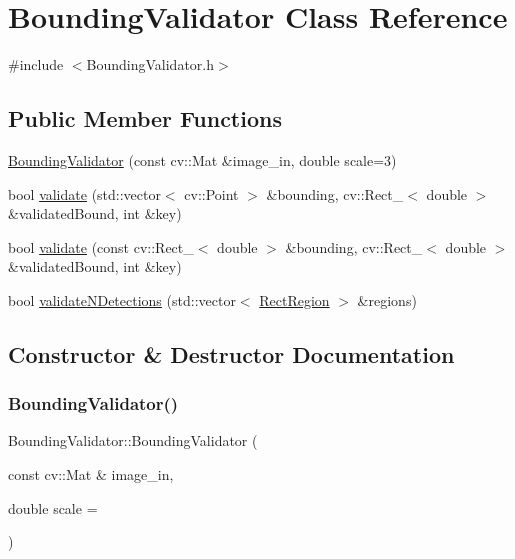 \hypertarget{class_bounding_validator}{}\section{Bounding\+Validator Class Reference}
\label{class_bounding_validator}


{\ttfamily \#include $<$Bounding\+Validator.\+h$>$}

\subsection*{Public Member Functions}
\begin{DoxyCompactItemize}
\item 
\hyperlink{class_bounding_validator_ae697e066d8c9d8bc0edb60282cec3324}{Bounding\+Validator} (const cv\+::\+Mat \&image\+\_\+in, double scale=3)
\item 
bool \hyperlink{class_bounding_validator_af81f3b37170e45eb241667604a47fece}{validate} (std\+::vector$<$ cv\+::\+Point $>$ \&bounding, cv\+::\+Rect\+\_\+$<$ double $>$ \&validated\+Bound, int \&key)
\item 
bool \hyperlink{class_bounding_validator_aeb223a7f1fcd5f62503c22167c4051dd}{validate} (const cv\+::\+Rect\+\_\+$<$ double $>$ \&bounding, cv\+::\+Rect\+\_\+$<$ double $>$ \&validated\+Bound, int \&key)
\item 
bool \hyperlink{class_bounding_validator_a490e960e21fae4b4e695314eb014fe22}{validate\+N\+Detections} (std\+::vector$<$ \hyperlink{struct_rect_region}{Rect\+Region} $>$ \&regions)
\end{DoxyCompactItemize}


\subsection{Constructor \& Destructor Documentation}
\mbox{\label{class_bounding_validator_ae697e066d8c9d8bc0edb60282cec3324}} 
\subsubsection{\texorpdfstring{Bounding\+Validator()}{BoundingValidator()}}
{\footnotesize\ttfamily Bounding\+Validator\+::\+Bounding\+Validator (\begin{DoxyParamCaption}\item[{const cv\+::\+Mat \&}]{image\+\_\+in,  }\item[{double}]{scale = {} }\end{DoxyParamCaption})\hspace{0.3cm}{\ttfamily [explicit]}}



